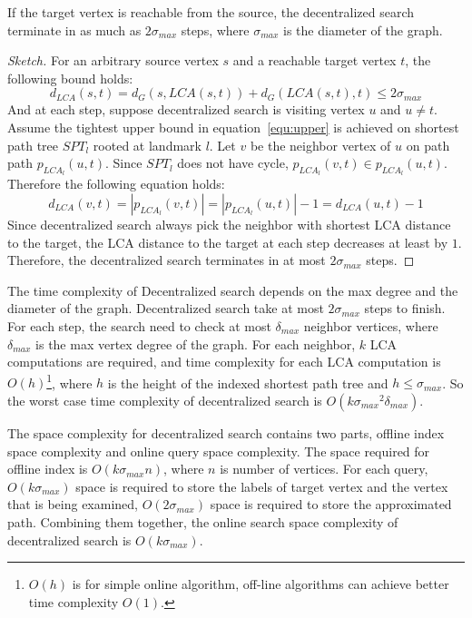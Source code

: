 \begin{theorem}
If the target vertex is reachable from the source, the decentralized search terminate in as much as $2{\sigma}_{max}$ steps, where ${\sigma}_{max}$ is the diameter of the graph. 
\end{theorem}
\begin{proof}[Sketch]
For an arbitrary source vertex $s$ and a reachable target vertex $t$, the following bound holds:
\[
    d_{LCA}(s,t) = d_G(s,LCA(s,t)) + d_G(LCA(s,t),t) \leq 2{\sigma}_{max}
\]
And at each step, suppose decentralized search is visiting vertex $u$ and $u \neq t$. Assume the tightest upper bound in equation~\ref{equ:upper} is achieved on shortest path tree $SPT_l$ rooted at landmark $l$. Let $v$ be the neighbor vertex of $u$ on path path $p_{LCA_l}(u,t)$. Since $SPT_l$ does not have cycle, $p_{LCA_l}(v,t) \in p_{LCA_l}(u,t)$. Therefore the following equation holds:
\[
		d_{LCA}(v,t) = |p_{LCA_l}(v,t)| = |p_{LCA_l}(u,t)| - 1 = d_{LCA}(u,t) - 1
\]
Since decentralized search always pick the neighbor with shortest LCA distance to the target, the LCA distance to the target at each step decreases at least by $1$. Therefore, the decentralized search terminates in at most $2{\sigma}_{max}$ steps. 
\end{proof}

The time complexity of Decentralized search depends on the max degree and the diameter of the graph. Decentralized search take at most $2{\sigma}_{max}$ steps to finish. For each step, the search need to check at most ${\delta}_{max}$ neighbor vertices, where ${\delta}_{max}$ is the max vertex degree of the graph. For each neighbor, $k$ LCA computations are required, and time complexity for each LCA computation is $O(h)$\footnote{$O(h)$ is for simple online algorithm, off-line algorithms can achieve better time complexity $O(1)$.}, where $h$ is the height of the indexed shortest path tree and $h \leq {\sigma}_{max}$. So the worst case time complexity of decentralized search is $O(k{{\sigma}_{max}}^2{\delta}_{max})$.

The space complexity for decentralized search contains two parts, offline index space complexity and online query space complexity. The space required for offline index is $O(k{\sigma}_{max}n)$, where $n$ is number of vertices. For each query, $O(k{\sigma}_{max})$ space is required to store the labels of target vertex and the vertex that is being examined, $O(2{\sigma}_{max})$ space is required to store the approximated path. Combining them together, the online search space complexity of decentralized search is $O(k{\sigma}_{max})$. 

